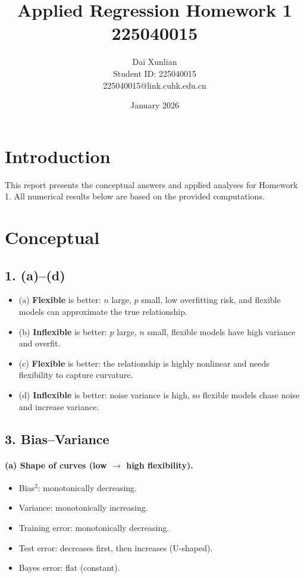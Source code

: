 \documentclass{article}
\title{Applied Regression Homework 1 225040015}
\author{Dai Xunlian\\Student ID: 225040015\\225040015@link.cuhk.edu.cn}
\date{January 2026}
\begin{document}
\maketitle

\section{Introduction}
This report presents the conceptual answers and applied analyses for Homework 1.
All numerical results below are based on the provided computations.

\section{Conceptual}
\subsection*{1. (a)--(d)}
\begin{itemize}
  \item (a) \textbf{Flexible} is better: $n$ large, $p$ small, low overfitting risk, and flexible models can approximate the true relationship.
  \item (b) \textbf{Inflexible} is better: $p$ large, $n$ small, flexible models have high variance and overfit.
  \item (c) \textbf{Flexible} is better: the relationship is highly nonlinear and needs flexibility to capture curvature.
  \item (d) \textbf{Inflexible} is better: noise variance is high, so flexible models chase noise and increase variance.
\end{itemize}

\subsection*{3. Bias--Variance}
\paragraph{(a) Shape of curves (low $\to$ high flexibility).}
\begin{itemize}
  \item Bias$^2$: monotonically decreasing.
  \item Variance: monotonically increasing.
  \item Training error: monotonically decreasing.
  \item Test error: decreases first, then increases (U-shaped).
  \item Bayes error: flat (constant).
\end{itemize}
\end{document}
